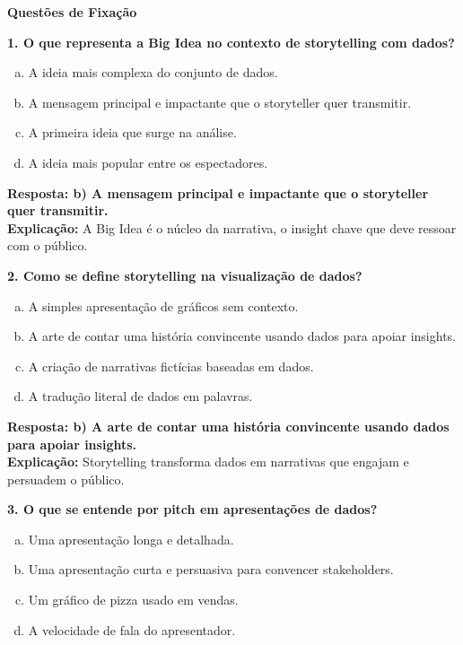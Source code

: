 \begin{SolvedBox}[orange]
\textbf{Questões de Fixação}

\textbf{1. O que representa a Big Idea no contexto de storytelling com dados?}

\begin{enumerate}[a)]
  \item A ideia mais complexa do conjunto de dados.
  \item A mensagem principal e impactante que o storyteller quer transmitir.
  \item A primeira ideia que surge na análise.
  \item A ideia mais popular entre os espectadores.
\end{enumerate}

\textbf{Resposta: b) A mensagem principal e impactante que o storyteller quer transmitir.} \\
\textbf{Explicação:} A Big Idea é o núcleo da narrativa, o insight chave que deve ressoar com o público.

\textbf{2. Como se define storytelling na visualização de dados?}

\begin{enumerate}[a)]
  \item A simples apresentação de gráficos sem contexto.
  \item A arte de contar uma história convincente usando dados para apoiar insights.
  \item A criação de narrativas fictícias baseadas em dados.
  \item A tradução literal de dados em palavras.
\end{enumerate}

\textbf{Resposta: b) A arte de contar uma história convincente usando dados para apoiar insights.} \\
\textbf{Explicação:} Storytelling transforma dados em narrativas que engajam e persuadem o público.

\textbf{3. O que se entende por pitch em apresentações de dados?}

\begin{enumerate}[a)]
  \item Uma apresentação longa e detalhada.
  \item Uma apresentação curta e persuasiva para convencer stakeholders.
  \item Um gráfico de pizza usado em vendas.
  \item A velocidade de fala do apresentador.
\end{enumerate}


\end{SolvedBox}
